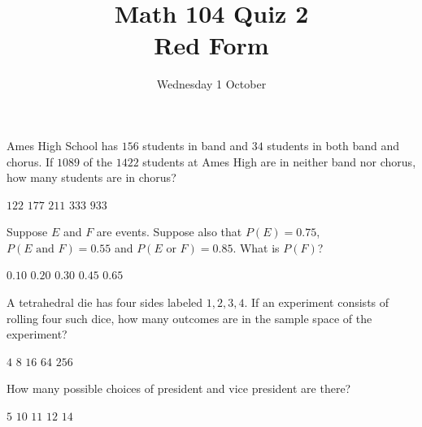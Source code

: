 \documentclass[12pt]{exam}
\title{Math 104 Quiz 2\\Red Form}
\date{Wednesday 1 October}
\begin{document}
\maketitle
\begin{center}
\end{center}

\begin{questions}
\question Ames High School has
$156$ students in band and $34$
students in both band and chorus.
If $1089$ of the $1422$ students at Ames High
are in neither band nor chorus, how many students
are in chorus?\\
\begin{oneparchoices}
\choice $122$ %
\choice $177$ %
\correctchoice $211$
\choice $333$ %
\choice $933$ %
\end{oneparchoices}

\question Suppose $E$ and $F$ are events.
Suppose also that $P\left(E\right)=0.75$,
$P\left(\text{$E$ and $F$}\right)=0.55$
and $P\left(\text{$E$ or $F$}\right)=0.85$. What
is $P\left(F\right)$?\\
\begin{oneparchoices}
\choice $0.10$ %
\choice $0.20$ %
\choice $0.30$ %
\choice $0.45$ %
\correctchoice $0.65$
\end{oneparchoices}

\question A tetrahedral die has four sides labeled $1,2,3,4$.
If an experiment consists of rolling four such dice, how
many outcomes are in the sample space of the experiment?\\
\begin{oneparchoices}
\choice $4$ %
\choice $8$
\choice $16$ %
\choice $64$ %
\correctchoice $256$
\end{oneparchoices}


\question\label{FirstPresident}
How many possible choices of president and vice president are there?\\
\begin{oneparchoices}
\choice $5$ %
\correctchoice $10$
\choice $11$ %
\choice $12$ %
\choice $14$ %
\end{oneparchoices}


\end{questions}
\end{document}
